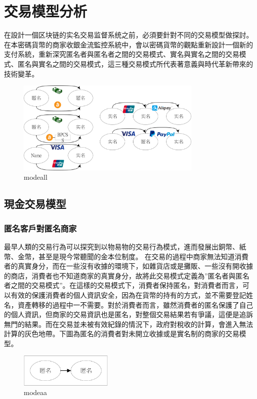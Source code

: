 
\chapter{交易模型分析}
在設計一個区块链的实名交易监督系统之前，必須要針對不同的交易模型做探討。
在本密碼貨幣的商家收銀金流監控系統中，會以密碼貨幣的觀點重新設計一個新的支付系統，重新深究匿名者與匿名者之間的交易模式、實名與實名之間的交易模式、匿名與實名之間的交易模式，這三種交易模式所代表著意義與時代革新帶來的技術變革。
\begin{figure}[h]
	\centering
	\includegraphics[width = 0.8\textwidth]{modeall.png}
	\caption{modeall}\label{modeall}
\end{figure}

	\section{現金交易模型}
		\subsection{匿名客戶對匿名商家}最早人類的交易行為可以探究到以物易物的交易行為模式，進而發展出銅幣、紙幣、金幣，甚至是現今常聽聞的金本位制度。 
		在交易的過程中商家無法知道消費者的真實身分，而在一些沒有收據的環境下，如雜貨店或是攤販、一些沒有開收據的商店，消費者也不知道商家的真實身分，故將此交易模式定義為”匿名者與匿名者之間的交易模式”。在這樣的交易模式下，消費者保持匿名，對消費者而言，可以有效的保護消費者的個人資訊安全，因為在貨幣的持有的方式，並不需要登記姓名，資產轉移的過程中一不需要。對於消費者而言，雖然消費者的匿名保護了自己的個人資訊，但商家的交易資訊也是匿名，對整個交易結果若有爭議，這便是追訴無門的結果。而在交易並未被有效紀錄的情況下，政府對稅收的計算，會進入無法計算的灰色地帶。下圖為匿名的消費者對未開立收據或是實名制的商家的交易模型。

		\begin{figure}[h]
			\centering
			\includegraphics[width = 0.4\textwidth]{modeaa.png}
			\caption{modeaa}\label{modeaa}
		\end{figure}

